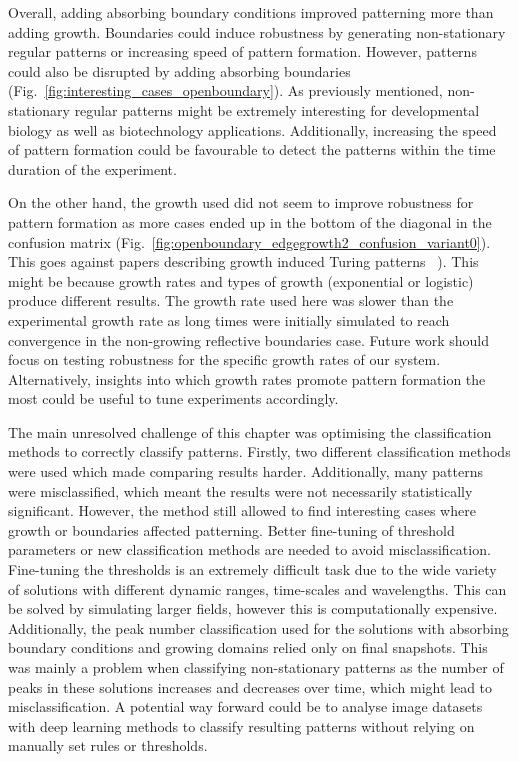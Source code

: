 Overall, adding absorbing boundary conditions improved patterning more than adding growth.
Boundaries could induce robustness by generating non-stationary regular patterns or increasing speed of pattern formation.
However, patterns could also be disrupted by adding absorbing boundaries (Fig.~\ref{fig:interesting_cases_openboundary}).
As previously mentioned, non-stationary regular patterns might be extremely interesting for developmental biology as well as biotechnology applications.
Additionally, increasing the speed of pattern formation could be favourable to detect the patterns within the time duration of the experiment.

On the other hand, the growth used did not seem to improve robustness for pattern formation as more cases ended up in the bottom of the diagonal in the confusion matrix (Fig.~\ref{fig:openboundary_edgegrowth2_confusion_variant0}).
This goes against papers describing growth induced Turing patterns ~\parencite{gaffney2010}).
This might be because growth rates and types of growth (exponential or logistic) produce different results.
The growth rate used here was slower than the experimental growth rate as long times were initially simulated to reach convergence in the non-growing reflective boundaries case.
Future work should focus on testing robustness for the specific growth rates of our system.
Alternatively, insights into which growth rates promote pattern formation the most could be useful to tune experiments accordingly.

The main unresolved challenge of this chapter was optimising the classification methods to correctly classify patterns.
Firstly, two different classification methods were used which made comparing results harder.
Additionally, many patterns were misclassified, which meant the results were not necessarily statistically significant.
However, the method still allowed to find interesting cases where growth or boundaries affected patterning.
Better fine-tuning of threshold parameters or new classification methods are needed to avoid misclassification.
Fine-tuning the thresholds is an extremely difficult task due to the wide variety of solutions with different dynamic ranges, time-scales and wavelengths.
This can be solved by simulating larger fields, however this is computationally expensive.
Additionally, the peak number classification used for the solutions with absorbing boundary conditions and growing domains relied only on final snapshots.
This was mainly a problem when classifying non-stationary patterns as the number of peaks in these solutions increases and decreases over time, which might lead to misclassification.
A potential way forward could be to analyse image datasets with deep learning methods to classify resulting patterns without relying on manually set rules or thresholds.

